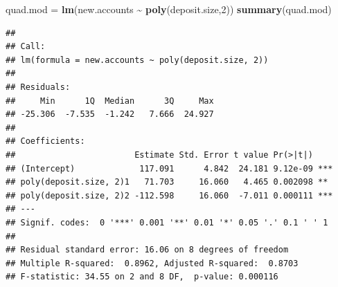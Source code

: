 \documentclass[
]{article}
\newenvironment{Shaded}{\begin{snugshade}}{\end{snugshade}}
\newcommand{\DecValTok}[1]{\textcolor[rgb]{0.00,0.00,0.81}{#1}}
\newcommand{\FunctionTok}[1]{\textcolor[rgb]{0.13,0.29,0.53}{\textbf{#1}}}
\newcommand{\NormalTok}[1]{#1}
\newcommand{\OtherTok}[1]{\textcolor[rgb]{0.56,0.35,0.01}{#1}}
\newcommand{\SpecialCharTok}[1]{\textcolor[rgb]{0.81,0.36,0.00}{\textbf{#1}}}
\begin{document}
\begin{Shaded}
\begin{Highlighting}[]
\NormalTok{quad.mod }\OtherTok{=} \FunctionTok{lm}\NormalTok{(new.accounts }\SpecialCharTok{\textasciitilde{}} \FunctionTok{poly}\NormalTok{(deposit.size,}\DecValTok{2}\NormalTok{))}
\FunctionTok{summary}\NormalTok{(quad.mod)}
\end{Highlighting}
\end{Shaded}

\begin{verbatim}
## 
## Call:
## lm(formula = new.accounts ~ poly(deposit.size, 2))
## 
## Residuals:
##     Min      1Q  Median      3Q     Max 
## -25.306  -7.535  -1.242   7.666  24.927 
## 
## Coefficients:
##                        Estimate Std. Error t value Pr(>|t|)    
## (Intercept)             117.091      4.842  24.181 9.12e-09 ***
## poly(deposit.size, 2)1   71.703     16.060   4.465 0.002098 ** 
## poly(deposit.size, 2)2 -112.598     16.060  -7.011 0.000111 ***
## ---
## Signif. codes:  0 '***' 0.001 '**' 0.01 '*' 0.05 '.' 0.1 ' ' 1
## 
## Residual standard error: 16.06 on 8 degrees of freedom
## Multiple R-squared:  0.8962, Adjusted R-squared:  0.8703 
## F-statistic: 34.55 on 2 and 8 DF,  p-value: 0.000116
\end{verbatim}
\end{document}
